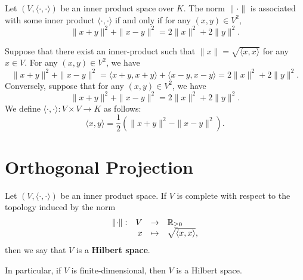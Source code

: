 \begin{propositionenv}
    Let $\left(V,\langle \cdot ,\cdot\rangle\right)$ be an inner product space over $K$.
    The norm $\| \cdot \|$ is associated with some inner product $\langle \cdot ,\cdot\rangle$ if and only if for any $(x,y)\in V^2$,
    $$ \|x+y\|^2 + \|x-y\|^2 = 2\|x\|^2 + 2\|y\|^2. $$
\end{propositionenv}
\begin{proofenv}
    Suppose that there exist an inner-product such that $\| x\| = \sqrt{\langle x,x\rangle}$ for any $x\in V$. For any $(x,y)\in V^2$, we have
    $$ \| x+y\|^2 + \| x-y\|^2 = \langle x+y, x+y\rangle + \langle x-y, x-y\rangle = 2\| x\|^2 + 2\| y\|^2.$$
    Conversely, suppose that for any $(x,y)\in V^2$, we have
    $$ \| x+y\|^2 + \| x-y\|^2 = 2\| x\|^2 + 2\| y\|^2.$$
    We define $\langle \cdot ,\cdot\rangle : V\times V \rightarrow K$ as follows:
    $$ \langle x,y\rangle = \frac{1}{2}\left(\|x+y\|^2 - \|x-y\|^2\right).$$
\end{proofenv}

\section{Orthogonal Projection}
\begin{definitionenv}
    Let $\left(V, \langle \cdot, \cdot \rangle\right)$ be an inner product space. 
    If $V$ is complete with respect to the topology induced by the norm
    $$\begin{array}{rrcl}
        \left\| \cdot \right\|: & V & \rightarrow & \mathbb{R}_{\ge 0}\\
        & x & \mapsto & \sqrt{\langle x,x\rangle},
    \end{array}$$
    then we say that $V$ is a \textbf{Hilbert space}.

    \quad In particular, if $V$ is finite-dimensional, then $V$ is a Hilbert space.
\end{definitionenv}

